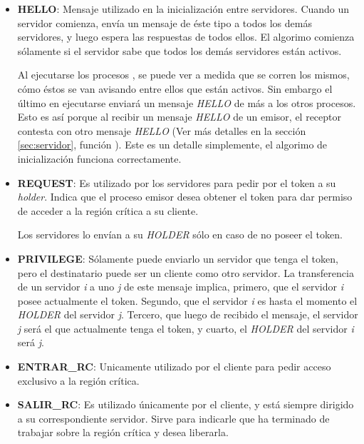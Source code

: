 \begin{itemize}

\item \textbf{HELLO}: Mensaje utilizado en la inicialización entre servidores.
Cuando un servidor comienza, envía un mensaje de éste tipo a todos los demás
servidores, y luego espera las respuestas de todos ellos. El algorimo comienza
sólamente si el servidor sabe que todos los demás servidores están activos.

Al ejecutarse los procesos , se puede ver a medida que se
corren los mismos, cómo éstos se van avisando entre ellos que están activos.
Sin embargo el último en ejecutarse enviará un mensaje \emph{HELLO} de más a
los otros procesos. Esto es así porque al recibir un mensaje \emph{HELLO} de un
emisor, el receptor contesta con otro mensaje \emph{HELLO} (Ver más detalles en
la sección \ref{sec:servidor}, función ). Este es un
detalle simplemente, el algorimo de inicialización funciona correctamente.

\item \textbf{REQUEST}: Es utilizado por los servidores para pedir por el token
a su \emph{holder}. Indica que el proceso  emisor desea obtener
el token para dar permiso de acceder a la región crítica a su cliente.

Los servidores lo envían a su \emph{HOLDER} sólo en caso de no poseer el token.

\item \textbf{PRIVILEGE}: Sólamente puede enviarlo un servidor que tenga el
token, pero el destinatario puede ser un cliente como otro servidor. La
transferencia de un servidor \textsl{i} a uno \textsl{j} de este mensaje
implica, primero, que el servidor \textsl{i} posee actualmente el token.
Segundo, que el servidor \textsl{i} es hasta el momento el \emph{HOLDER} del
servidor \textsl{j}. Tercero, que luego de recibido el mensaje, el servidor
\textsl{j} será el que actualmente tenga el token, y cuarto, el \emph{HOLDER}
del servidor \textsl{i} será \textsl{j}.

\item \textbf{ENTRAR\_RC}: Unicamente utilizado por el cliente para pedir
acceso exclusivo a la región crítica.

\item \textbf{SALIR\_RC}: Es utilizado únicamente por el cliente, y está
siempre dirigido a su correspondiente servidor. Sirve para indicarle que ha
terminado de trabajar sobre la región crítica y desea liberarla.

\end{itemize}

